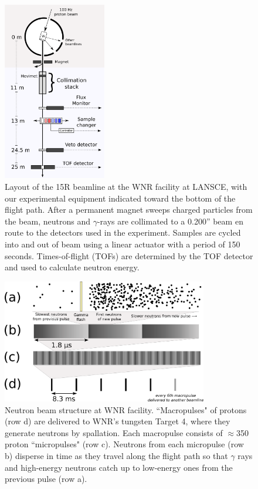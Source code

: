 \begin{figure}[h]
    \centering
    \includegraphics[width=0.4\textwidth]{figures/ExperimentalSetup.png}
    \caption[Layout of the 15R beamline at the WNR facility at LANSCE]
        {Layout of the 15R beamline at the WNR facility at LANSCE, with our
    experimental equipment indicated toward the bottom of the flight path.
    After a permanent magnet sweeps charged particles from the beam, neutrons and
    $\gamma$-rays are collimated to a 0.200'' beam en route to the
    detectors used in the experiment. Samples are cycled into and out of beam
    using a linear actuator with a period of 150 seconds. Times-of-flight (TOFs) are
    determined by the TOF detector and used to calculate neutron energy.
}
    \label{ExperimentalApparatus}
\end{figure}

\begin{figure}[h]
    \centering
    \includegraphics[width=0.8\textwidth]{figures/beamStructure.png}
    \caption[Pulsed structure of the neutron beam at the WNR facility]
    {
        Neutron beam structure at WNR facility.
        ``Macropulses" of protons (row d) are delivered to
        WNR's tungsten Target 4, where they generate neutrons by spallation.
        Each macropulse consists of
        $\approx$350 proton ``micropulses" (row c). Neutrons
        from each micropulse (row b) disperse in
        time as they travel along the flight path so that $\gamma$ rays and high-energy 
        neutrons catch up to low-energy ones from the previous pulse (row a).
    }
    \label{BeamStructure}
\end{figure}

